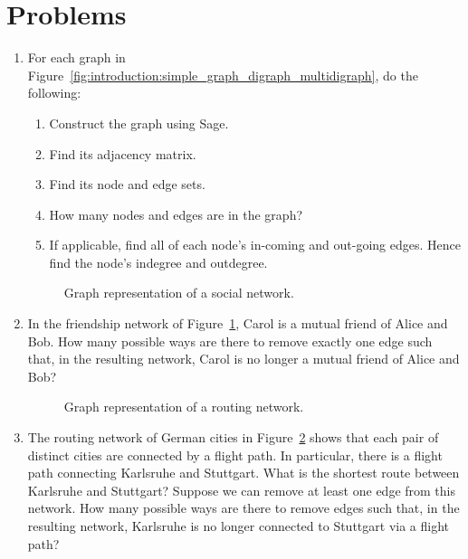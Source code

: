 
\section{Problems}

\begin{enumerate}
\item For each graph in
  Figure~\ref{fig:introduction:simple_graph_digraph_multidigraph}, do
  the following:
  \begin{enumerate}
  \item Construct the graph using Sage.

  \item Find its adjacency matrix.

  \item Find its node and edge sets.

  \item How many nodes and edges are in the graph?

  \item If applicable, find all of each node's in-coming and out-going
    edges. Hence find the node's indegree and outdegree.
  \end{enumerate}

  \begin{figure}[!htbp]
    \centering
    
    \caption{Graph representation of a social network.}
    \label{fig:introduction:social_network}
  \end{figure}

\item In the friendship network of
  Figure~\ref{fig:introduction:social_network}, Carol is a mutual
  friend of Alice and Bob. How many possible ways are there to remove
  exactly one edge such that, in the resulting network, Carol is no
  longer a mutual friend of Alice and Bob?

  \begin{figure}[!htbp]
    \centering
    
    \caption{Graph representation of a routing network.}
    \label{fig:introduction:routing_network}
  \end{figure}

\item The routing network of German cities in
  Figure~\ref{fig:introduction:routing_network} shows that each pair
  of distinct cities are connected by a flight path. In particular,
  there is a flight path connecting Karlsruhe and Stuttgart. What is
  the shortest route between Karlsruhe and Stuttgart? Suppose we can
  remove at least one edge from this network. How many possible ways
  are there to remove edges such that, in the resulting network,
  Karlsruhe is no longer connected to Stuttgart via a flight path?


\end{enumerate}
